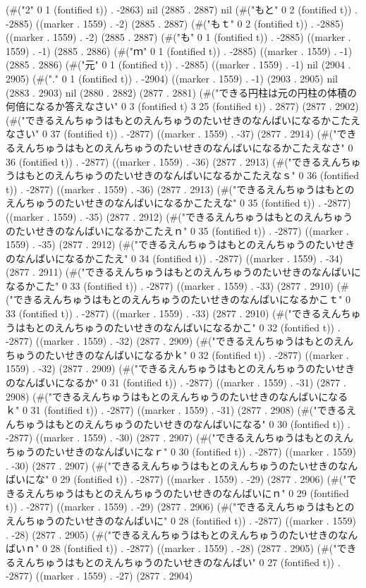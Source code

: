 {(#("2" 0 1 (fontified t)) . -2863) nil (2885 . 2887) nil (#("もと" 0 2 (fontified t)) . -2885) ((marker . 1559) . -2) (2885 . 2887) (#("もｔ" 0 2 (fontified t)) . -2885) ((marker . 1559) . -2) (2885 . 2887) (#("も" 0 1 (fontified t)) . -2885) ((marker . 1559) . -1) (2885 . 2886) (#("ｍ" 0 1 (fontified t)) . -2885) ((marker . 1559) . -1) (2885 . 2886) (#("元" 0 1 (fontified t)) . -2885) ((marker . 1559) . -1) nil (2904 . 2905) (#("." 0 1 (fontified t)) . -2904) ((marker . 1559) . -1) (2903 . 2905) nil (2883 . 2903) nil (2880 . 2882) (2877 . 2881) (#("できる円柱は元の円柱の体積の何倍になるか答えなさい" 0 3 (fontified t) 3 25 (fontified t)) . 2877) (2877 . 2902) (#("できるえんちゅうはもとのえんちゅうのたいせきのなんばいになるかこたえなさい" 0 37 (fontified t)) . -2877) ((marker . 1559) . -37) (2877 . 2914) (#("できるえんちゅうはもとのえんちゅうのたいせきのなんばいになるかこたえなさ" 0 36 (fontified t)) . -2877) ((marker . 1559) . -36) (2877 . 2913) (#("できるえんちゅうはもとのえんちゅうのたいせきのなんばいになるかこたえなｓ" 0 36 (fontified t)) . -2877) ((marker . 1559) . -36) (2877 . 2913) (#("できるえんちゅうはもとのえんちゅうのたいせきのなんばいになるかこたえな" 0 35 (fontified t)) . -2877) ((marker . 1559) . -35) (2877 . 2912) (#("できるえんちゅうはもとのえんちゅうのたいせきのなんばいになるかこたえｎ" 0 35 (fontified t)) . -2877) ((marker . 1559) . -35) (2877 . 2912) (#("できるえんちゅうはもとのえんちゅうのたいせきのなんばいになるかこたえ" 0 34 (fontified t)) . -2877) ((marker . 1559) . -34) (2877 . 2911) (#("できるえんちゅうはもとのえんちゅうのたいせきのなんばいになるかこた" 0 33 (fontified t)) . -2877) ((marker . 1559) . -33) (2877 . 2910) (#("できるえんちゅうはもとのえんちゅうのたいせきのなんばいになるかこｔ" 0 33 (fontified t)) . -2877) ((marker . 1559) . -33) (2877 . 2910) (#("できるえんちゅうはもとのえんちゅうのたいせきのなんばいになるかこ" 0 32 (fontified t)) . -2877) ((marker . 1559) . -32) (2877 . 2909) (#("できるえんちゅうはもとのえんちゅうのたいせきのなんばいになるかｋ" 0 32 (fontified t)) . -2877) ((marker . 1559) . -32) (2877 . 2909) (#("できるえんちゅうはもとのえんちゅうのたいせきのなんばいになるか" 0 31 (fontified t)) . -2877) ((marker . 1559) . -31) (2877 . 2908) (#("できるえんちゅうはもとのえんちゅうのたいせきのなんばいになるｋ" 0 31 (fontified t)) . -2877) ((marker . 1559) . -31) (2877 . 2908) (#("できるえんちゅうはもとのえんちゅうのたいせきのなんばいになる" 0 30 (fontified t)) . -2877) ((marker . 1559) . -30) (2877 . 2907) (#("できるえんちゅうはもとのえんちゅうのたいせきのなんばいになｒ" 0 30 (fontified t)) . -2877) ((marker . 1559) . -30) (2877 . 2907) (#("できるえんちゅうはもとのえんちゅうのたいせきのなんばいにな" 0 29 (fontified t)) . -2877) ((marker . 1559) . -29) (2877 . 2906) (#("できるえんちゅうはもとのえんちゅうのたいせきのなんばいにｎ" 0 29 (fontified t)) . -2877) ((marker . 1559) . -29) (2877 . 2906) (#("できるえんちゅうはもとのえんちゅうのたいせきのなんばいに" 0 28 (fontified t)) . -2877) ((marker . 1559) . -28) (2877 . 2905) (#("できるえんちゅうはもとのえんちゅうのたいせきのなんばいｎ" 0 28 (fontified t)) . -2877) ((marker . 1559) . -28) (2877 . 2905) (#("できるえんちゅうはもとのえんちゅうのたいせきのなんばい" 0 27 (fontified t)) . -2877) ((marker . 1559) . -27) (2877 . 2904) }
